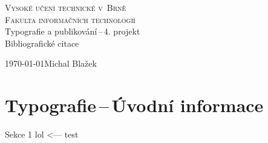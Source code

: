 \documentclass[a4paper, 11pt]{article}
\begin{document}
\begin{titlepage}
\begin{center}
    \Huge
    \textsc{Vysoké učení technické v~Brně\\
    \huge{Fakulta informačních technologií}}\\
    \LARGE{Typografie a publikování\,--\,4. projekt}\\
    \Huge{Bibliografické citace}\\
\end{center}
{\Large \today \hfill Michal Blažek}
\end{titlepage}

\section{Typografie\,--\,Úvodní informace}

Sekce 1 lol \cite{Rybicka2003} <--- test

\newpage



\end{document}
